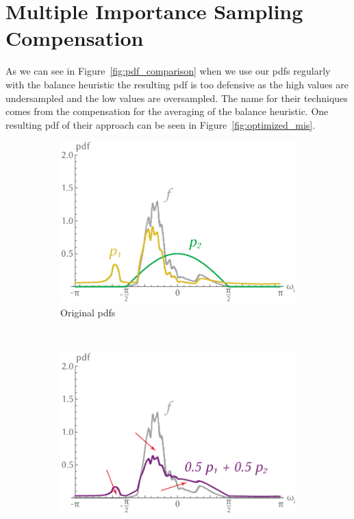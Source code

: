 \chapter{Multiple Importance Sampling Compensation}
\label{ch:mis_compensation}
As we can see in Figure~\ref{fig:pdf_comparison} when we use our pdfs regularly with the balance heuristic
the resulting pdf is too defensive as the high values are undersampled and the low values are oversampled.
The name for their techniques comes from the compensation for the averaging of the balance heuristic.
One resulting pdf of their approach can be seen in Figure~\ref{fig:optimized_mis}.

\begin{figure}[h]
    \centering
    \begin{subfigure}[b]{.3\textwidth}
        \centering
        \includegraphics[width=\textwidth]{images/original_setup.png}
        \caption{Original pdfs}
        \label{fig:original_setup}
    \end{subfigure}
    ~
    \begin{subfigure}[b]{.3\textwidth}
        \centering
        \includegraphics[width=\textwidth]{images/mis_setup.png}

\end{subfigure}
\end{figure}
